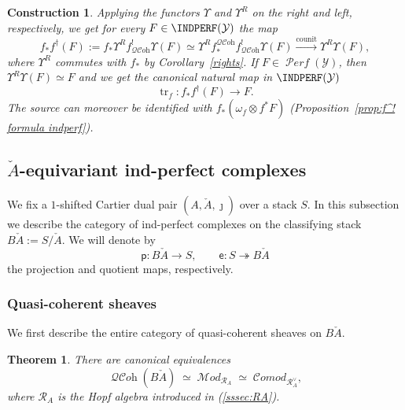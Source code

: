 \documentclass[12pt, oneside]{amsart}
\numberwithin{equation}{section}
\newtheorem{theorem}[subsubsection]{Theorem}
\newtheorem{construction}[subsubsection]{Construction}
\theoremstyle{remark}
\theoremstyle{plain}
\newcommand{\MOD}{\mathcal{M}\textit{od}}
\newcommand{\COMOD}{\mathcal{C}\textit{omod}}
\DeclareMathOperator{\QCOH}{\mathcal{QC}\textit{oh}}
\DeclareMathOperator{\PERF}{\mathcal{P}\textit{erf}}
\newcommand{\R}{\mathcal{R}}
\newcommand{\RA}{\R_A}
\newcommand{\YY}{\mathcal{Y}}
\newcommand{\Ren}{\Upsilon}
\newcommand{\sfp}{\mathsf{p}}
\newcommand{\sfe}{\mathsf{e}}
\begin{document}
\begin{construction}\label{constr:trace indperf}
Applying the functors $\Ren$ and $\Ren^R$ on the right and left, respectively, we get for every $F \in \INDPERF(\YY)$ the map
\[
  f_* f^\dag (F) :=
  f_*\Ren^R f^!_{\QCOH} \Ren(F) \simeq \Ren^R f_*^{\QCOH} f^!_{\QCOH} \Ren(F) \xrightarrow{\mathrm{counit}} \Ren^R \Ren(F),
\]
where $\Ren^R$ commutes with $f_*$ by Corollary~\ref{rights}.
If $F \in \PERF(\YY)$, then $\Ren^R\Ren(F) \simeq F$ and we get the canonical natural map in $\INDPERF(\YY)$
\[
  \operatorname{tr}_f : f_* f^\dag (F) \longrightarrow F.
\]
The source can moreover be identified with $f_*(\omega_f \otimes f^*F)$ (Proposition~\ref{prop:f^! formula indperf}).
\end{construction}

\subsection{\texorpdfstring{$\check{A}$}{Ǎ}-equivariant ind-perfect complexes}\label{ssec:rotation}

We fix a $1$-shifted Cartier dual pair $(A, \check{A}, \jmath)$ over a stack $S$.
In this subsection we describe the category of ind-perfect complexes on the classifying stack $B\check{A} := S/\check{A}$.
We will denote by
$$\sfp : B\check{A} \to S, \qquad \sfe : S \twoheadrightarrow B\check{A}$$
the projection and quotient maps, respectively.

\subsubsection{Quasi-coherent sheaves}

We first describe the entire category of quasi-coherent sheaves on $B\check{A}$.

\begin{theorem}\label{thm:QCoh checkA}
  There are canonical equivalences
  \begin{equation*}
    \QCOH(B\check{A})
    \;\simeq\; \MOD_{\RA}
    \;\simeq\; \COMOD_{\RA^\vee},
  \end{equation*}
  where $\RA$ is the Hopf algebra introduced in (\ref{sssec:RA}).
\end{theorem}
\end{document}
